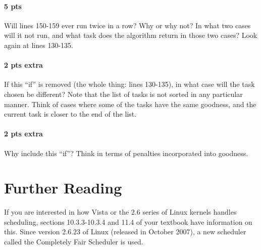 \documentclass[letterpaper,10pt]{article}
\begin{document}
\paragraph{5 pts} Will lines 150-159 ever run twice in a row? Why or why not? In what two
cases will it not run, and what task does the algorithm return in those two cases?
Look again at lines 130-135.
\paragraph{2 pts extra} If this ``if'' is removed (the whole thing: lines 130-135), in what case will
the task chosen be different? Note that the list of tasks is not sorted in any particular
manner. Think of cases where some of the tasks have the same goodness, and the
current task is closer to the end of the list.
\paragraph{2 pts extra} Why include this ``if''? Think in terms of penalties incorporated into
goodness.

\section{Further Reading}
If you are interested in how Vista or the 2.6 series of Linux kernels handles scheduling, sections
10.3.3-10.3.4 and 11.4 of your textbook have information on this. Since version 2.6.23 of Linux
(released in October 2007), a new scheduler called the Completely Fair Scheduler is used.
\end{document}
